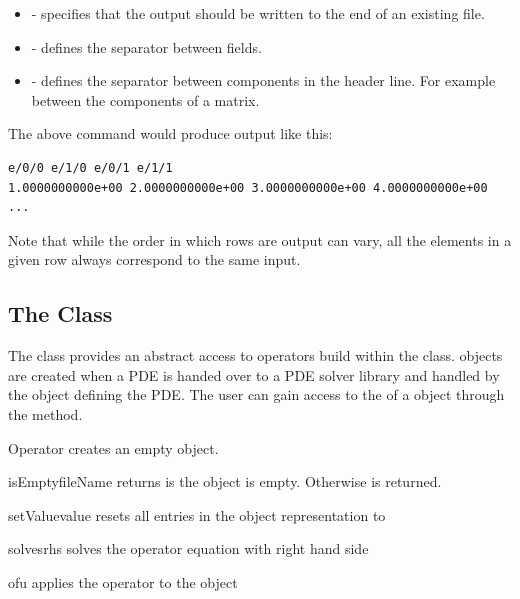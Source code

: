 \begin{itemize}
 \item {} - specifies that the output should be written to the end of an existing file.
\item {} - defines the separator between fields.
\item {} - defines the separator between components in the header line. For example between the components of a matrix.
\end{itemize}

The above command would produce output like this:
\begin{verbatim}
e/0/0 e/1/0 e/0/1 e/1/1
1.0000000000e+00 2.0000000000e+00 3.0000000000e+00 4.0000000000e+00
...
\end{verbatim}

Note that while the order in which rows are output can vary, all the elements in a given row
always correspond to the same input.


\subsection{The \Operator Class}
The \Operator class provides an abstract access to operators build
within the \LinearPDE class. \Operator objects are created
when a PDE is handed over to a PDE solver library and handled
by the \LinearPDE object defining the PDE. The user can gain access
to the \Operator of a \LinearPDE object through the 
method.

\begin{classdesc}{Operator}{}
creates an empty \Operator object.
\end{classdesc}

\begin{methoddesc}[Operator]{isEmpty}{fileName}
returns \True is the object is empty. Otherwise \True is returned.
\end{methoddesc}

\begin{methoddesc}[Operator]{setValue}{value}
resets all entries in the object representation to 
\end{methoddesc}

\begin{methoddesc}[Operator]{solves}{rhs}
solves the operator equation with right hand side 
\end{methoddesc}

\begin{methoddesc}[Operator]{of}{u}
applies the operator to the \Data object 
\end{methoddesc}

